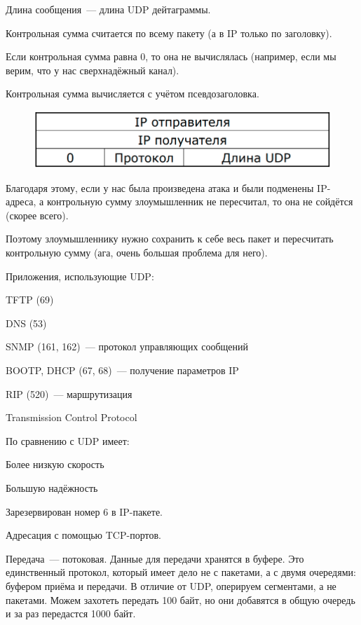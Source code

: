 Длина сообщения~--- длина UDP дейтаграммы.

Контрольная сумма считается по всему пакету (а в IP только по заголовку).

Если контрольная сумма равна 0, то она не вычислялась (например, если мы верим, что у нас сверхнадёжный канал).

Контрольная сумма вычисляется с учётом псевдозаголовка.

\begin{figure}[H]
  \centering
  \includegraphics[width=15cm]{images/03/02}
\end{figure}

Благодаря этому, если у нас была произведена атака и были подменены IP-адреса, а контрольную сумму злоумышленник не пересчитал, то она не сойдётся (скорее всего).

Поэтому злоумышленнику нужно сохранить к себе весь пакет и пересчитать контрольную сумму (ага, очень большая проблема для него).

Приложения, использующие UDP:
\begin{MyItemize}
    \item TFTP (69)
    \item DNS (53)
    \item SNMP (161, 162)~--- протокол управляющих сообщений
    \item BOOTP, DHCP (67, 68)~--- получение параметров IP
    \item RIP (520)~--- маршрутизация
\end{MyItemize}


Transmission Control Protocol

По сравнению с UDP имеет:
\begin{MyItemize}
    \item Более низкую скорость
    \item Большую надёжность
\end{MyItemize}

Зарезервирован номер 6 в IP-пакете.

Адресация с помощью TCP-портов.

Передача~--- потоковая. Данные для передачи хранятся в буфере. Это единственный протокол, который имеет дело не с пакетами, а с двумя очередями: буфером приёма и передачи. В отличие от UDP, оперируем сегментами, а не пакетами. Можем захотеть передать 100 байт, но они добавятся в общую очередь и за раз передастся 1000 байт.

